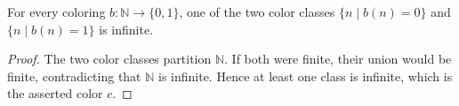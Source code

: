 \begin{lemma}
For every coloring $b:\mathbb N\to\{0,1\}$, one of the two color classes
$\{n\mid b(n)=0\}$ and $\{n\mid b(n)=1\}$ is infinite.
\end{lemma}
\begin{proof}
The two color classes partition $\mathbb N$.  If both were finite, their
union would be finite, contradicting that $\mathbb N$ is infinite.  Hence at
least one class is infinite, which is the asserted color $c$.
\end{proof}
